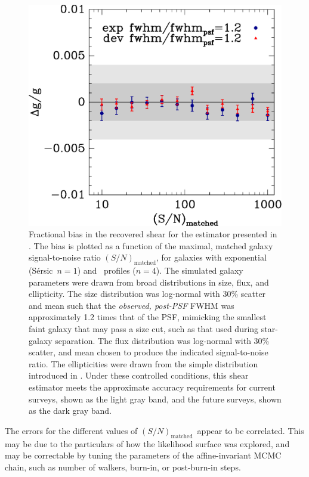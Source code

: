 \documentclass[usegraphicx,usenatbib]{mn2e}
\newcommand{\Msn}{$(S/N)_{\textrm{matched}}$}
\newcommand{\sersic}{S\'{e}rsic}
\newcommand{\lognormscatt}{30}
\begin{document}
\begin{figure}
 \includegraphics[scale=0.45]{figures/ngmix-fwhm1.2.eps}
 \caption{ Fractional bias in the recovered shear for the estimator presented
     in \citet{ba14}.  The bias is plotted as a function of the maximal, matched
     galaxy signal-to-noise ratio \Msn, for galaxies with exponential (\sersic\
     $n=1$) and \devauc\ profiles ($n=4$).  The simulated galaxy parameters
     were drawn from broad distributions in size, flux, and ellipticity.  The
     size distribution was log-normal with \lognormscatt\% scatter and mean
     such that the {\it observed, post-PSF} FWHM was approximately 1.2 times
     that of the PSF, mimicking the smallest faint galaxy that may pass a size
     cut, such as that used during star-galaxy separation.  The flux
     distribution was log-normal with \lognormscatt\% scatter, and mean chosen
     to produce the indicated signal-to-noise ratio.  The ellipticities were
     drawn from the simple distribution introduced in \citet{ba14}. Under these
     controlled conditions, this shear estimator meets the approximate accuracy
 requirements for current surveys, shown as the light gray band, and the future
 surveys, shown as the dark gray band.}
 \label{fig:fracerr}
\end{figure}

The errors for the different values of \Msn\ appear to be correlated.  This may
be due to the particulars of how the likelihood surface was explored, and may be
correctable by tuning the parameters of the affine-invariant MCMC chain, such
as number of walkers, burn-in, or post-burn-in steps.
\end{document}
